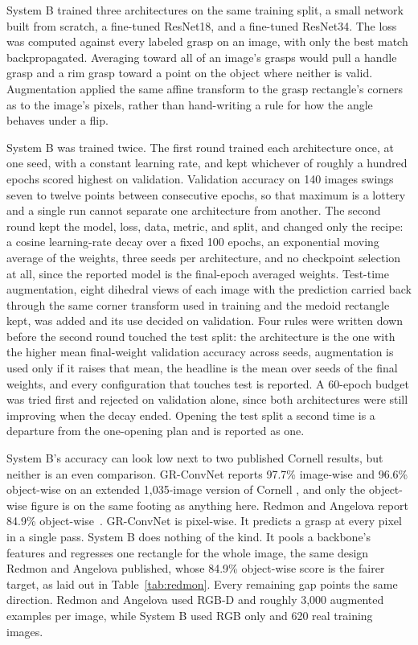 \documentclass[12pt,letterpaper]{article}
\begin{document}
System B trained three architectures on the same training split, a
small network built from scratch, a fine-tuned ResNet18, and a
fine-tuned ResNet34. The loss was computed against every labeled grasp
on an image, with only the best match backpropagated. Averaging toward
all of an image's grasps would pull a handle grasp and a rim grasp
toward a point on the object where neither is valid. Augmentation
applied the same affine transform to the grasp rectangle's corners as
to the image's pixels, rather than hand-writing a rule for how the
angle behaves under a flip.

System B was trained twice. The first round trained each architecture
once, at one seed, with a constant learning rate, and kept whichever of
roughly a hundred epochs scored highest on validation. Validation
accuracy on 140 images swings seven to twelve points between
consecutive epochs, so that maximum is a lottery and a single run
cannot separate one architecture from another. The second round kept
the model, loss, data, metric, and split, and changed only the recipe:
a cosine learning-rate decay over a fixed 100 epochs, an exponential
moving average of the weights, three seeds per architecture, and no
checkpoint selection at all, since the reported model is the
final-epoch averaged weights. Test-time augmentation, eight dihedral
views of each image with the prediction carried back through the same
corner transform used in training and the medoid rectangle kept, was
added and its use decided on validation. Four rules were written down
before the second round touched the test split: the architecture is
the one with the higher mean final-weight validation accuracy across
seeds, augmentation is used only if it raises that mean, the headline
is the mean over seeds of the final weights, and every configuration
that touches test is reported. A 60-epoch budget was tried first and
rejected on validation alone, since both architectures were still
improving when the decay ended. Opening the test split a second time
is a departure from the one-opening plan and is reported as one.

System B's accuracy can look low next to two published Cornell results,
but neither is an even comparison. GR-ConvNet reports 97.7\% image-wise
and 96.6\% object-wise on an extended 1,035-image version of Cornell
\cite{kumra2020}, and only the object-wise figure is on the same
footing as anything here. Redmon and Angelova report 84.9\%
object-wise~\cite{redmon2015}. GR-ConvNet is pixel-wise. It predicts a grasp at
every pixel in a single pass. System B does nothing of the kind. It
pools a backbone's features and regresses one rectangle for the whole
image, the same design Redmon and Angelova published, whose 84.9\%
object-wise score is the fairer target, as laid out in
Table~\ref{tab:redmon}. Every remaining gap points the same direction.
Redmon and Angelova used RGB-D and roughly 3,000 augmented examples per
image, while System B used RGB only and 620 real training images.
\end{document}
